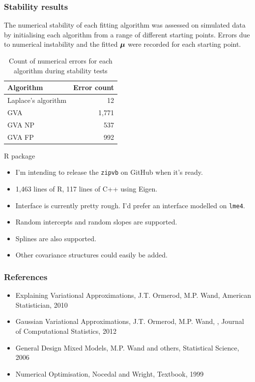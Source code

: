 \documentclass{beamer}
\begin{document}
	\begin{frame}
		\frametitle{Stability results}
		
		
		The numerical stability of each fitting algorithm was assessed on simulated data by initialising
		each algorithm from a range of different starting points. Errors due to numerical instability and the fitted
		${\boldsymbol \mu}$ were recorded for each starting point.
		
		\begin{table}
			\caption{Count of numerical errors for each algorithm during stability tests}
			\label{tab:stability_results}
			\begin{tabular}{|l|r|}
				\hline
				Algorithm           & Error count \\
				\hline
				Laplace's algorithm & 12          \\
				GVA                 & 1,771       \\
				GVA NP              & 537         \\
				GVA FP              & 992         \\
				\hline
			\end{tabular}
		\end{table}
	\end{frame}
	
	\begin{frame}{R package}
		\begin{itemize}
			\item I'm intending to release the \texttt{zipvb} on GitHub when it's ready.
			\item 1,463 lines of R, 117 lines of C++ using Eigen.
			\item Interface is currently pretty rough. I'd prefer an interface modelled on \texttt{lme4}.
			\item Random intercepts and random slopes are supported.
			\item Splines are also supported.
			\item Other covariance structures could easily be added.
		\end{itemize}	
	\end{frame}
		
	\begin{frame}
		\frametitle{References}
		\begin{itemize}
			\item Explaining Variational Approximations, J.T. Ormerod, M.P. Wand, American Statistician, 2010
			\item Gaussian Variational Approximations, J.T. Ormerod, M.P. Wand, , Journal of Computational Statistics, 2012
			\item General Design Mixed Models, M.P. Wand and others, Statistical Science, 2006
			\item Numerical Optimisation, Nocedal and Wright, Textbook, 1999
		\end{itemize}
	\end{frame}
		
\end{document}
